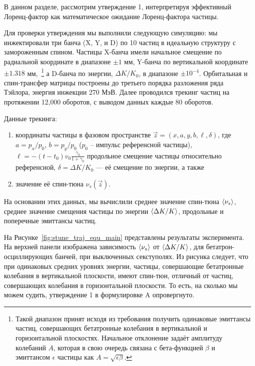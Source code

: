 
В данном разделе, рассмотрим утверждение 1, интерпретируя эффективный Лоренц-фактор как математическое ожидание Лоренц-фактора частицы.

Для проверки утверждения мы выполнили следующую симуляцию: 
мы инжектировали три банча (X, Y, и D) по 10 частиц в идеальную структуру с замороженным спином. 
Частицы X-банча имели начальное смещение по радиальной координате 
в диапазоне $\pm 1$ мм, Y-банча по вертикальной координате $\pm 1.318$ мм,~\footnote{Такой диапазон 
	принят исходя из требования получить одинаковые эмиттансы частиц, 
	совершающих бетатронные колебания в вертикальной и горизонтальной плоскостях. 
	Начальное отклонение задаёт амплитуду колебаний $A$, 
	которая в свою очередь связана с бета-функцией  $\beta$ и эмиттансом $\epsilon$ частицы 
	как ${A = \sqrt{\epsilon \beta}}$. } а D-банча по энергии,  ${\Delta K/K_0}$, в диапазоне ${\pm 10^{-4}}$. 
Орбитальная и спин-трансфер матрицы построены до третьего порядка разложения ряда Тэйлора, 
энергия инжекции 270 МэВ.
Далее проводился трекинг частиц на протяжении 12,000 оборотов, с выводом данных каждые 80 оборотов. 

Данные трекинга: 
\begin{enumerate}[(1)]
	\item координаты частицы в фазовом пространстве ${\vec z = (x,a,y,b,\ell, \delta)}$, 
где ${a=p_x/p_0}$, ${b=p_y/p_0}$ ($p_0$ -- импульс референсной частицы),
${\ell = -(t-t_0)v_0\frac{\gamma_0}{1+\gamma_0}}$ продольное смещение частицы относительно референсной,
${\delta = \Delta K/K_0}$ --- её смещение по энергии, а также 
\item значение её спин-тюна ${\nu_s(\vec z)}$. 
\end{enumerate}
На основании этих данных, мы вычислили среднее значение спин-тюна $\avg{\nu_s}$, 
среднее значение смещения частицы по энергии $\avg{\Delta K/K}$, продольные и поперечные эмиттансы частиц.

На Рисунке~\ref{fig:stune_traj_equ_main} представлены результаты эксперимента. На верхней панели изображена зависимость $\avg{\nu_s}$ от $\avg{\Delta K/K}$, для бетатрон-осциллирующих банчей, при выключенных секступолях. Из рисунка следует, что при одинаковых средних уровнях энергии, частицы, совершающие бетатронные колебания в вертикальной плоскости, имеют спин-тюн, отличный от частиц, совершающих колебания в горизонтальной плоскости. То есть, на сколько мы можем судить, утверждение 1 в формулировке A опровергнуто.

